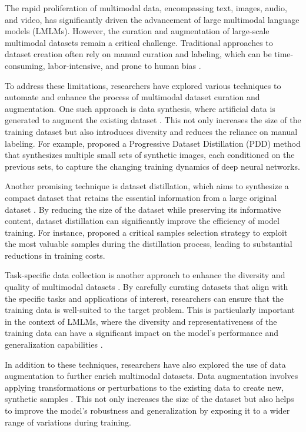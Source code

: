 \documentclass[11pt]{article}
\begin{document}
The rapid proliferation of multimodal data, encompassing text, images, audio, and video, has significantly driven the advancement of large multimodal language models (LMLMs). However, the curation and augmentation of large-scale multimodal datasets remain a critical challenge. Traditional approaches to dataset creation often rely on manual curation and labeling, which can be time-consuming, labor-intensive, and prone to human bias \cite{ref127,ref128}.

To address these limitations, researchers have explored various techniques to automate and enhance the process of multimodal dataset curation and augmentation. One such approach is data synthesis, where artificial data is generated to augment the existing dataset \cite{ref128,ref129}. This not only increases the size of the training dataset but also introduces diversity and reduces the reliance on manual labeling. For example, \cite{ref129} proposed a Progressive Dataset Distillation (PDD) method that synthesizes multiple small sets of synthetic images, each conditioned on the previous sets, to capture the changing training dynamics of deep neural networks.

Another promising technique is dataset distillation, which aims to synthesize a compact dataset that retains the essential information from a large original dataset \cite{ref130,ref131,ref128}. By reducing the size of the dataset while preserving its informative content, dataset distillation can significantly improve the efficiency of model training. For instance, \cite{ref131} proposed a critical samples selection strategy to exploit the most valuable samples during the distillation process, leading to substantial reductions in training costs.

Task-specific data collection is another approach to enhance the diversity and quality of multimodal datasets \cite{ref132}. By carefully curating datasets that align with the specific tasks and applications of interest, researchers can ensure that the training data is well-suited to the target problem. This is particularly important in the context of LMLMs, where the diversity and representativeness of the training data can have a significant impact on the model's performance and generalization capabilities \cite{ref132}.

In addition to these techniques, researchers have also explored the use of data augmentation to further enrich multimodal datasets. Data augmentation involves applying transformations or perturbations to the existing data to create new, synthetic samples \cite{ref133,ref134,ref135}. This not only increases the size of the dataset but also helps to improve the model's robustness and generalization by exposing it to a wider range of variations during training.
\end{document}
